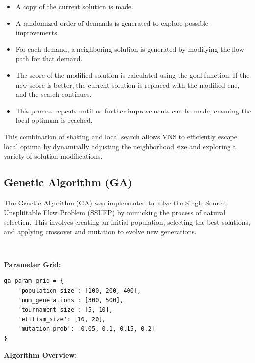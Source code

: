 \documentclass[a4paper,12pt]{article}
\begin{document}
\begin{itemize}
    \item A copy of the current solution is made.
    \item A randomized order of demands is generated to explore possible improvements.
    \item For each demand, a neighboring solution is generated by modifying the flow path for that demand.
    \item The score of the modified solution is calculated using the goal function. If the new score is better, the current solution is replaced with the modified one, and the search continues.
    \item This process repeats until no further improvements can be made, ensuring the local optimum is reached.
\end{itemize}

\noindent This combination of shaking and local search allows VNS to efficiently escape local optima by dynamically adjusting the neighborhood size and exploring a variety of solution modifications.

\subsection{Genetic Algorithm (GA)}

The Genetic Algorithm (GA) was implemented to solve the Single-Source Unsplittable Flow Problem (SSUFP) by mimicking the process of natural selection. This involves creating an initial population, selecting the best solutions, and applying crossover and mutation to evolve new generations.

\

\noindent \textbf{Parameter Grid:}

\begin{verbatim}
ga_param_grid = {
    'population_size': [100, 200, 400],
    'num_generations': [300, 500],
    'tournament_size': [5, 10],
    'elitism_size': [10, 20],
    'mutation_prob': [0.05, 0.1, 0.15, 0.2]
}
\end{verbatim}

\textbf{Algorithm Overview:}
\end{document}
